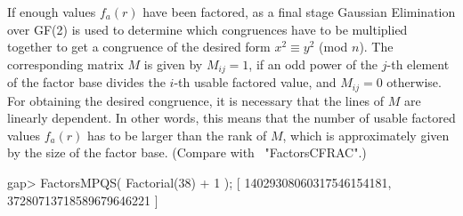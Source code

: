 If enough values $f_a(r)$ have been factored, as a final stage
Gaussian Elimination over GF(2) is used to determine which
congruences have to be multiplied together to get a congruence
of the desired form $x^2 \equiv y^2$ (mod $n$).
The corresponding matrix $M$ is given by $M_{ij} = 1$,
if an odd power of the $j$-th element of the factor base divides
the $i$-th usable factored value, and $M_{ij} = 0$ otherwise.
For obtaining the desired congruence, it is necessary that
the lines of $M$ are linearly dependent.
In other words, this means that the number of usable factored values
$f_a(r)$ has to be larger than the rank of $M$, which is approximately
given by the size of the factor base.
(Compare with ~"FactorsCFRAC".)

\beginexample
gap> FactorsMPQS( Factorial(38) + 1 );
[ 14029308060317546154181, 37280713718589679646221 ]
\endexample

